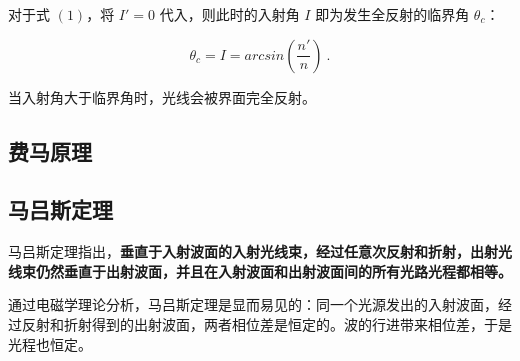 对于式 $(1)$，将 $I'=0$ 代入，则此时的入射角 $I$ 即为发生全反射的临界角 $\theta_c$：

\begin{equation}
\theta _c=I=arcsin(\frac{n'}{n}) ~.
\end{equation}

当入射角大于临界角时，光线会被界面完全反射。

\subsection{费马原理}

\subsection{马吕斯定理}

马吕斯定理指出，\textbf{垂直于入射波面的入射光线束，经过任意次反射和折射，出射光线束仍然垂直于出射波面，并且在入射波面和出射波面间的所有光路光程都相等。}

通过电磁学理论分析，马吕斯定理是显而易见的：同一个光源发出的入射波面，经过反射和折射得到的出射波面，两者相位差是恒定的。波的行进带来相位差，于是光程也恒定。
